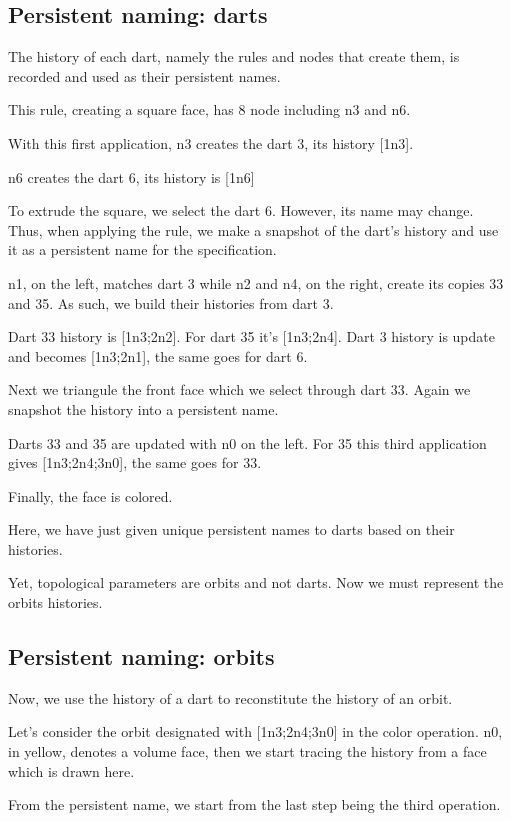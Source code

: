 \documentclass[11pt]{article}
\begin{document}
\subsection{Persistent naming: darts}
\label{sec:org53f1b92}

The history of each dart, namely the rules and nodes that create them, is
recorded and used as their persistent names. %

This rule, creating a square face, has 8 node including n3 and n6.

With this first application, n3 creates the dart 3, its history [1n3].

n6 creates the dart 6, its history is [1n6]

To extrude the square, we select the dart 6. However, its name may change. Thus,
when applying the rule, we make a snapshot of the dart's history and use it as a
persistent name for the specification.

n1, on the left, matches dart 3 while n2 and n4, on the right, create its copies 33 and 35. %
As such, we build their histories from dart 3.

Dart 33 history is [1n3;2n2]. %
For dart 35 it's [1n3;2n4]. %
Dart 3 history is update and becomes [1n3;2n1], the same goes for dart 6. %

Next we triangule the front face which we select through dart 33.
Again we snapshot the history into a persistent name.

Darts 33 and 35 are updated with n0 on the left.
For 35 this third application gives [1n3;2n4;3n0], the same goes for 33.

Finally, the face is colored.

Here, we have just given unique persistent names to darts based on their histories.

Yet, topological parameters are orbits and not darts.
Now we must represent the orbits histories.

\subsection{Persistent naming: orbits}
\label{sec:orgf5219a2}

Now, we use the history of a dart to reconstitute the history of an
orbit.

Let's consider the orbit designated with [1n3;2n4;3n0] in the color operation.
n0, in yellow, denotes a volume face, then we start tracing the history from a
face which is drawn here.

From the persistent name, we start from the last step being the third operation. %
\end{document}
